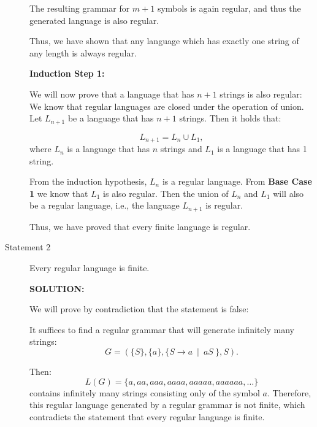 \documentclass[10pt]{article}
\begin{document}
\begin{description}
        The resulting grammar for $m+1$ symbols is again regular, and thus the generated language is also regular.
        
        Thus, we have shown that any language which has exactly one string of any length is always regular.

        \textbf{Induction Step 1:}
        
        We will now prove that a language that has $n + 1$ strings is also regular:
        We know that regular languages are closed under the operation of union. Let $L_{n+1}$ be a language that has $n+1$ strings. Then it holds that:

        $$L_{n+1} = L_{n} \cup L_{1},$$ where $L_{n}$ is a language that has $n$ strings and $L_{1}$ is a language that has 1 string.
        
        From the induction hypothesis, $L_{n}$ is a regular language. From \textbf{Base Case 1} we know that $L_1$ is also regular. Then the union of $L_n$ and $L_1$ will also be a regular language, i.e., the language $L_{n+1}$ is regular.

        Thus, we have proved that every finite language is regular.
        
        
    \item[Statement 2] Every regular language is finite.    
    
        \textbf{SOLUTION:} 

            We will prove by contradiction that the statement is false:

            It suffices to find a regular grammar that will generate infinitely many strings:
            $$G = ( \{S\}, \{a\}, \{ S \rightarrow a\ \mid\ aS\  \}, S ).$$

            Then:
            $$L(G) = \{a, aa, aaa, aaaa, aaaaa, aaaaaa, \dots\}$$ contains infinitely many strings consisting only of the symbol $a$. Therefore, this regular language generated by a regular grammar is not finite, which contradicts the statement that every regular language is finite.
    
\end{description}
\end{document}

